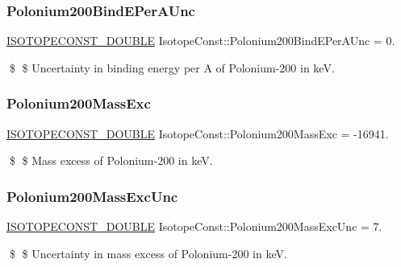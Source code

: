 \subsubsection{\texorpdfstring{Polonium200\+Bind\+E\+Per\+A\+Unc}{Polonium200BindEPerAUnc}}
{\footnotesize\ttfamily \mbox{\hyperlink{group___isotope_const-_macros_ga8f45a7272ce02c0b4c65c44636ed719a}{I\+S\+O\+T\+O\+P\+E\+C\+O\+N\+S\+T\+\_\+\+D\+O\+U\+B\+LE}} Isotope\+Const\+::\+Polonium200\+Bind\+E\+Per\+A\+Unc = 0.}

\$ \$ Uncertainty in binding energy per A of Polonium-\/200 in keV. \mbox{\label{group___isotope_const-_polonium-_po200_ga914e1bc64e487884d96bde908f3f27d9}} 
\subsubsection{\texorpdfstring{Polonium200\+Mass\+Exc}{Polonium200MassExc}}
{\footnotesize\ttfamily \mbox{\hyperlink{group___isotope_const-_macros_ga8f45a7272ce02c0b4c65c44636ed719a}{I\+S\+O\+T\+O\+P\+E\+C\+O\+N\+S\+T\+\_\+\+D\+O\+U\+B\+LE}} Isotope\+Const\+::\+Polonium200\+Mass\+Exc = -\/16941.}

\$ \$ Mass excess of Polonium-\/200 in keV. \mbox{\label{group___isotope_const-_polonium-_po200_ga6f6650470babd5dd2486de2b409b433d}} 
\subsubsection{\texorpdfstring{Polonium200\+Mass\+Exc\+Unc}{Polonium200MassExcUnc}}
{\footnotesize\ttfamily \mbox{\hyperlink{group___isotope_const-_macros_ga8f45a7272ce02c0b4c65c44636ed719a}{I\+S\+O\+T\+O\+P\+E\+C\+O\+N\+S\+T\+\_\+\+D\+O\+U\+B\+LE}} Isotope\+Const\+::\+Polonium200\+Mass\+Exc\+Unc = 7.}

\$ \$ Uncertainty in mass excess of Polonium-\/200 in keV. \mbox{\label{group___isotope_const-_polonium-_po200_ga1b3987867023e6047a4e7f3082d0c882}} 
